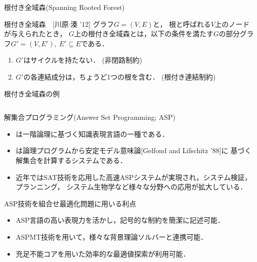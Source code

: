 \documentclass[dvipdfmx,11pt]{beamer}
\begin{document}
\begin{frame}{根付き全域森(Spanning Rooted Forest)}

 \begin{block}{根付き全域森~~[川原$\cdot$湊 '12]}
  グラフ$G=(V,E)$と，
  \alert{根}と呼ばれる$V$上のノードが与えられたとき，
  $G$上の根付き全域森とは，以下の条件を満たす$G$の部分グラフ$G'=(V,E'),\ E' \subseteq E$である．
  \begin{enumerate}
   \item $G'$はサイクルを持たない． (\alert{非閉路制約})
   \item $G'$の各連結成分は，ちょうど1つの根を含む． (\alert{根付き連結制約})
  \end{enumerate}
 \end{block}

 \begin{exampleblock}{根付き全域森の例}
  \begin{columns}
   \begin{column}{0.45\textwidth}
	\centering
	
   \end{column}
   \begin{column}{0.45\textwidth}
	\centering
	
   \end{column}
  \end{columns}


 \end{exampleblock}
 
\end{frame}

\begin{frame}{解集合プログラミング(Answer Set Programming; ASP)}
 \begin{itemize}
  \item {}は一階論理に基づく知識表現言語の一種である．
  \item {}は論理プログラムから安定モデル意味論[Gelfond and Lifschitz '88]に
		基づく解集合を計算するシステムである．
  \item 近年ではSAT技術を応用した高速ASPシステムが実現され，システム検証，プランニング，
		システム生物学など様々な分野への応用が拡大している．
 \end{itemize}

 \begin{alertblock}{ASP技術を組合せ最適化問題に用いる利点}
   \begin{itemize}
	\item ASP言語の高い表現力を活かし，記号的な制約を簡潔に記述可能．
	\item ASPMT技術を用いて，様々な背景理論ソルバーと連携可能．
	\item 充足不能コアを用いた効率的な最適値探索が利用可能．
   \end{itemize}
 \end{alertblock}

\end{frame}
\end{document}
